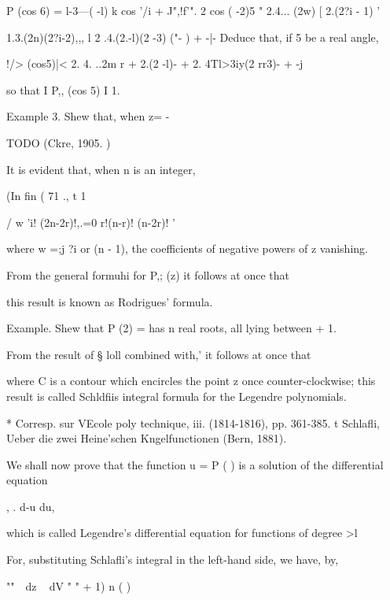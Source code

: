 P (cos 6) = l-3---( -l) k cos '/i + J",!f'". 2 cos ( -2)5 " 2.4...
(2w) [ 2.(2?i - 1) '

1.3.(2n)(2?i-2),,, l 2 .4.(2.-l)(2 -3) ("- ) + -|- Deduce that, if 5
be a real angle,

!/> (cos5)|< 2. 4. ..2m r + 2.(2 -l)- + 2. 4Tl>3iy(2 rr3)- + -j

so that I P,, (cos 5) I 1. 

Example 3. Shew that, when z= -\,

TODO
(Ckre, 1905. )


It is evident that, when n is an integer,

(In fin ( 71 ., t 1

  / w 'i! (2n-2r)!,.=0 r!(n-r)! (n-2r)! '

where w =;j ?i or (n - 1), the coefficients of negative powers of z
vanishing.

From the general formuhi for P,; (z) it follows at once that

this result is known as Rodrigues' formula.

Example. Shew that P (2) = has n real roots, all lying between + 1.


From the result of § loll combined with,' it follows at once
that

where C is a contour which encircles the point z once
counter-clockwise; this result is called Schldfiis integral formula
for the Legendre polynomials.

* Corresp. sur VEcole poly technique, iii. (1814-1816), pp. 361-385. t
Schlafli, Ueber die zwei Heine'schen Kngelfunctionen (Bern, 1881).

%
%


We shall now prove that the function u = P ( ) is a solution of the
differential equation

, . d-u du,

which is called Legendre's differential equation for functions of
degree >l

For, substituting Schlafli's integral in the left-hand side, we have,
by,

  ""~~dz ~ dV " " + 1) n ( )

